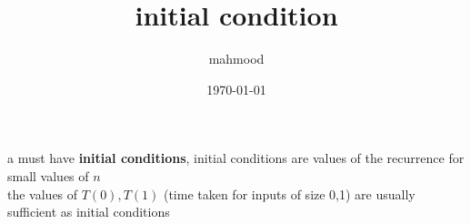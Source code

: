\documentclass[a4paper,12pt]{article}
\author{mahmood}
\date{\today}
\title{initial condition}
\begin{document}
\maketitle
a must have \textbf{initial conditions}, initial conditions are values of the recurrence for small values of \(n\)\\[0pt]
the values of \(T(0),T(1)\) (time taken for inputs of size 0,1) are usually sufficient as initial conditions
\end{document}
